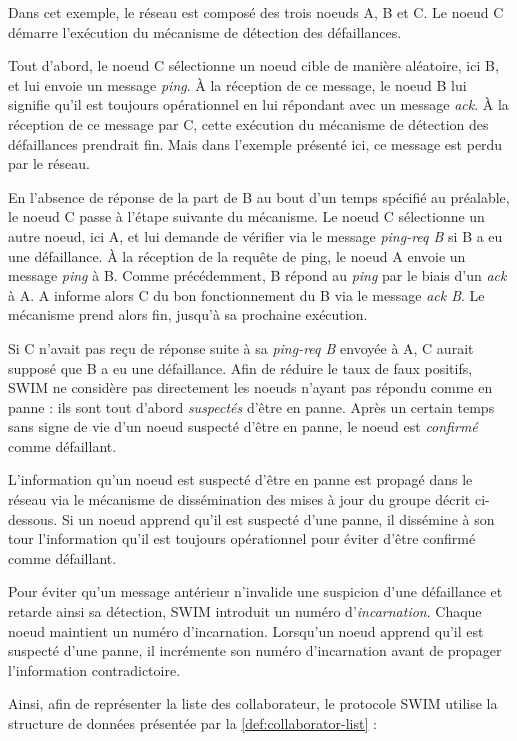 \documentclass[12pt]{thesul}
\begin{document}
Dans cet exemple, le réseau est composé des trois noeuds A, B et C.
Le noeud C démarre l'exécution du mécanisme de détection des défaillances.

Tout d'abord, le noeud C sélectionne un noeud cible de manière aléatoire, ici B, et lui envoie un message \emph{ping}.
À la réception de ce message, le noeud B lui signifie qu'il est toujours opérationnel en lui répondant avec un message \emph{ack}.
À la réception de ce message par C, cette exécution du mécanisme de détection des défaillances prendrait fin.
Mais dans l'exemple présenté ici, ce message est perdu par le réseau.

En l'absence de réponse de la part de B au bout d'un temps spécifié au préalable, le noeud C passe à l'étape suivante du mécanisme.
Le noeud C sélectionne un autre noeud, ici A, et lui demande de vérifier via le message \emph{ping-req B} si B a eu une défaillance.
À la réception de la requête de ping, le noeud A envoie un message \emph{ping} à B.
Comme précédemment, B répond au \emph{ping} par le biais d'un \emph{ack} à A.
A informe alors C du bon fonctionnement du B via le message \emph{ack B}.
Le mécanisme prend alors fin, jusqu'à sa prochaine exécution.

Si C n'avait pas reçu de réponse suite à sa \emph{ping-req B} envoyée à A, C aurait supposé que B a eu une défaillance.
Afin de réduire le taux de faux positifs, SWIM ne considère pas directement les noeuds n'ayant pas répondu comme en panne : ils sont tout d'abord \emph{suspectés} d'être en panne.
Après un certain temps sans signe de vie d'un noeud suspecté d'être en panne, le noeud est \emph{confirmé} comme défaillant.

L'information qu'un noeud est suspecté d'être en panne est propagé dans le réseau via le mécanisme de dissémination des mises à jour du groupe décrit ci-dessous.
Si un noeud apprend qu'il est suspecté d'une panne, il dissémine à son tour l'information qu'il est toujours opérationnel pour éviter d'être confirmé comme défaillant.

Pour éviter qu'un message antérieur n'invalide une suspicion d'une défaillance et retarde ainsi sa détection, SWIM introduit un numéro d'\emph{incarnation}.
Chaque noeud maintient un numéro d'incarnation.
Lorsqu'un noeud apprend qu'il est suspecté d'une panne, il incrémente son numéro d'incarnation avant de propager l'information contradictoire.

Ainsi, afin de représenter la liste des collaborateur, le protocole SWIM utilise la structure de données présentée par la \autoref{def:collaborator-list} :
\end{document}

